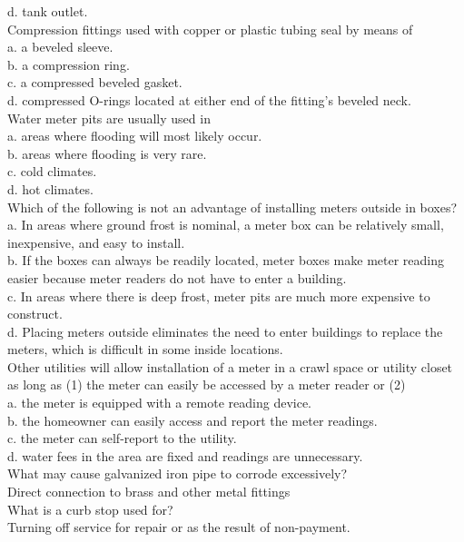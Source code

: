 d.	tank outlet.\\
Compression fittings used with copper or plastic tubing seal by means of\\
a.	a beveled sleeve.\\
b.	a compression ring.\\
c.	a compressed beveled gasket.\\
d.	compressed O-rings located at either end of the fitting's beveled neck.\\
Water meter pits are usually used in\\
a.	areas where flooding will most likely occur.\\
b.	areas where flooding is very rare.\\
c.	cold climates.\\
d.	hot climates.\\
Which of the following is not an advantage of installing meters outside in boxes?\\
a.	In areas where ground frost is nominal, a meter box can be relatively small, inexpensive, and easy to install.\\
b.	If the boxes can always be readily located, meter boxes make meter reading easier because meter readers do not have to enter a building.\\
c.	In areas where there is deep frost, meter pits are much more expensive to construct.\\
d.	Placing meters outside eliminates the need to enter buildings to replace the meters, which is difficult in some inside locations.\\
Other utilities will allow installation of a meter in a crawl space or utility closet as long as (1) the meter can easily be accessed by a meter reader or (2)\\
a.	the meter is equipped with a remote reading device.\\
b.	the homeowner can easily access and report the meter readings.\\
c.	the meter can self-report to the utility.\\
d.	water fees in the area are fixed and readings are unnecessary.\\
What may cause galvanized iron pipe to corrode excessively?\\
Direct connection to brass and other metal fittings\\
What is a curb stop used for?\\
Turning off service for repair or as the result of non-payment.\\
